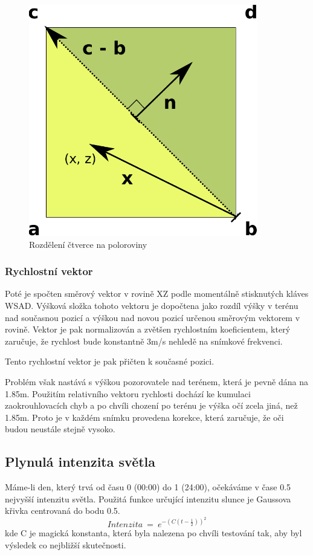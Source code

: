 \documentclass[11pt]{article}
\begin{document}
\begin{figure}[ht!]
\centering
\includegraphics[width=10cm]{triangl.pdf}
	\caption{Rozdělení čtverce na poloroviny}
\end{figure}
\clearpage


\subsubsection{Rychlostní vektor}
Poté je spočten směrový vektor v rovině XZ podle momentálně stisknutých
kláves WSAD. Výšková složka tohoto vektoru je dopočtena jako rozdíl výšky v
terénu nad současnou pozicí a výškou nad novou pozicí určenou směrovým vektorem
v rovině. Vektor je pak normalizován a zvětšen rychlostním koeficientem, který
zaručuje, že rychlost bude konstantně 3m/s nehledě na snímkové frekvenci.

Tento rychlostní vektor je pak přičten k současné pozici.

Problém však nastává s výškou pozorovatele nad terénem, která je pevně dána na
1.85m. Použitím relativního vektoru rychlosti dochází ke kumulaci
zaokrouhlovacích chyb a po chvíli chození po terénu je výška očí zcela jiná,
než 1.85m. Proto je v každém snímku provedena korekce, která zaručuje, že oči
budou neustále stejně vysoko.

\subsection{Plynulá intenzita světla}
Máme-li den, který trvá od času 0 (00:00) do 1 (24:00), očekáváme v čase 0.5
nejvyšší intenzitu světla. Použitá funkce určující intenzitu slunce je Gaussova
křivka centrovaná do bodu 0.5.
$$
Intenzita~=~e^{- (C(t - \frac{1}{2}))^2}
$$
kde C je magická konstanta, která byla nalezena po chvíli testování tak, aby
byl výsledek co nejbližší skutečnosti.
\end{document}
